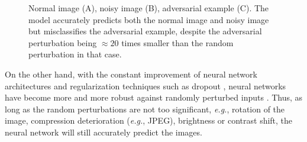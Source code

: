 \begin{figure}[!htb]
      

    \caption{ Normal image (A), noisy image (B), adversarial example (C). The
        model accurately predicts both the normal image and noisy image but
        misclassifies the adversarial example, despite the adversarial
        perturbation being $\approx{20}$ times smaller than the random
        perturbation in that case. }
    \label{fig:noise}
\end{figure}

On the other hand, with the constant improvement of neural network architectures
\cite{he_deep_2015,vaswani_attention_2017,huang_densely_2018} and regularization
techniques such as dropout \cite{srivastava_dropout_2014}, neural networks have
become more and more robust against randomly perturbed inputs
\cite{hendrycks_benchmarking_2019}. Thus, as long as the random perturbations
are not too significant, \emph{e.g.}, rotation of the image, compression
deterioration (\emph{e.g.}, JPEG), brightness or contrast shift, the neural
network will still accurately predict the images.

